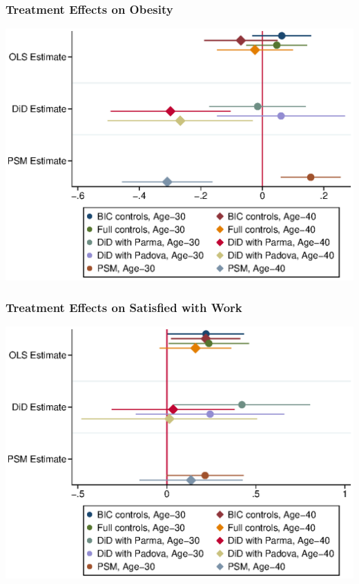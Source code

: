 \begin{frame}
	\frametitle{Treatment Effects on Obesity} 
	\includegraphics[scale=0.8]{../../../output/image/coefplot-BMI_obese-adult.eps}

\end{frame}

\begin{frame}
	\frametitle{Treatment Effects on Satisfied with Work} 

	\includegraphics[scale=0.8]{../../../output/image/coefplot-SatisWork-adult.eps}
\end{frame}

